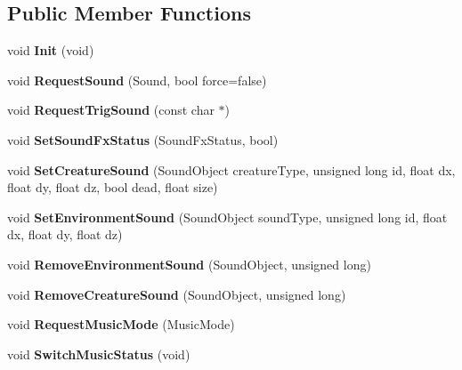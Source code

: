 \subsection*{\-Public \-Member \-Functions}
\begin{DoxyCompactItemize}
\item 
\hypertarget{classSoundControl_ae1a682985df01f0168d0caa2b3720ad1}{void {\bfseries \-Init} (void)}\label{classSoundControl_ae1a682985df01f0168d0caa2b3720ad1}

\item 
\hypertarget{classSoundControl_adca6d26b1b2ab21c6e32bd4fdeeadc19}{void {\bfseries \-Request\-Sound} (\-Sound, bool force=false)}\label{classSoundControl_adca6d26b1b2ab21c6e32bd4fdeeadc19}

\item 
\hypertarget{classSoundControl_a985abbcd6b9da230de73ebef2246b9cc}{void {\bfseries \-Request\-Trig\-Sound} (const char $\ast$)}\label{classSoundControl_a985abbcd6b9da230de73ebef2246b9cc}

\item 
\hypertarget{classSoundControl_abf99429f897755f6ce4e9e11fb99a0a1}{void {\bfseries \-Set\-Sound\-Fx\-Status} (\-Sound\-Fx\-Status, bool)}\label{classSoundControl_abf99429f897755f6ce4e9e11fb99a0a1}

\item 
\hypertarget{classSoundControl_a87de9f20ec5cf1610884d11426bf74b1}{void {\bfseries \-Set\-Creature\-Sound} (\-Sound\-Object creature\-Type, unsigned long id, float dx, float dy, float dz, bool dead, float size)}\label{classSoundControl_a87de9f20ec5cf1610884d11426bf74b1}

\item 
\hypertarget{classSoundControl_ad497e8f68a196b808bacb8f10b500c80}{void {\bfseries \-Set\-Environment\-Sound} (\-Sound\-Object sound\-Type, unsigned long id, float dx, float dy, float dz)}\label{classSoundControl_ad497e8f68a196b808bacb8f10b500c80}

\item 
\hypertarget{classSoundControl_a7c8e1e1194ba512938b61b349051c4ea}{void {\bfseries \-Remove\-Environment\-Sound} (\-Sound\-Object, unsigned long)}\label{classSoundControl_a7c8e1e1194ba512938b61b349051c4ea}

\item 
\hypertarget{classSoundControl_a96cbb50216b7e97eafac670d4077652f}{void {\bfseries \-Remove\-Creature\-Sound} (\-Sound\-Object, unsigned long)}\label{classSoundControl_a96cbb50216b7e97eafac670d4077652f}

\item 
\hypertarget{classSoundControl_ae6ee9c713ab7dd729cfd6dff33ac044f}{void {\bfseries \-Request\-Music\-Mode} (\-Music\-Mode)}\label{classSoundControl_ae6ee9c713ab7dd729cfd6dff33ac044f}

\item 
\hypertarget{classSoundControl_ae964016f7953bd952e25fc1ab8263dfc}{void {\bfseries \-Switch\-Music\-Status} (void)}\label{classSoundControl_ae964016f7953bd952e25fc1ab8263dfc}

\end{DoxyCompactItemize}

